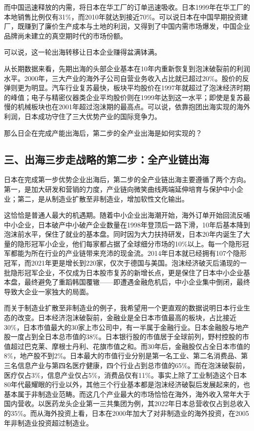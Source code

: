 而中国迅速释放的内需，将日本在华工厂的订单迅速吸收。日本1999年在华工厂的本地销售比例仅有31\%，而2010年就达到接近70\%。可以说日本在中国早期投资建厂，既赚到了廉价生产成本与土地的利润，又得到了中国内需市场爆发，中国企业品牌尚未建立的真空期时代的市场份额。

可以说，这一轮出海转移让日本企业赚得盆满钵满。

从长期数据来看，先期出海的头部企业基本在10年内重新恢复到泡沫破裂前的利润水平。2000年，三大产业的海外子公司自营业务收入占比就已超过20\%。股价的反弹则更为明显。汽车行业复苏最快，板块平均股价在1997年就超过了泡沫经济时期的峰值；电子与精密仪器类企业平均股价则在1999年达到这一水平；即使是复苏最慢的机械板块也在2001年超过泡沫期的最高点。可以说，依靠抱团出海实现的海外利润，日本成功守住了三大优势产业的国际竞争力。

那么日企在完成产能出海后，第二步的全产业出海是如何实现的？

\subsection{三、出海三步走战略的第二步：全产业链出海}

日本在完成第一步优势企业出海后，第二步的全产业链出海主要遵循了两个方向。第一，是加大研发和营销的力度，产业链向微笑曲线两端延伸培育与保护中小企业；第二，是从制造业扩散至非制造业，增加软性文化输出。

这恰恰是普通人最大的机遇期。随着中小企业出海潮开始，海外订单开始回流反哺中小企业，日本破产中小破产企业数量在1998年登顶后一路下滑，10年后基本降到泡沫前水平，保住了就业的基本盘。同时因为大力扶持研发，日本20年内诞生了大量的隐形冠军小企业，他们每家都占据了全球细分市场的10\%以上。每一个隐形冠军都能为所在行业的产业链带来充沛的现金流。2014年日本就已经拥有107个隐形冠军，而2021年更是增长到220家，仅次于德国与美国。泡沫经济破灭后涌现的一批隐形冠军企业，不仅成为日本股市复苏的新增长点，更是保住了日本中小企业基本盘，最终避免了重蹈韩国覆辙——即遭遇金融危机后，中小企业集中倒闭，最终导致大企业一家独大的局面。

而关于制造业扩散至非制造业的例子，我希望用一个更直观的数据说明日本行业生态的改变。日本经济泡沫破裂前，金融业是全日本市值最高的板块，占比接近30\%，日本市值最大的30家上市公司中，有一半属于金融行业。日本金融股与地产股一度占到全日本总市值的38\%。日本银行股的市值居于全球前列，野村控股的市值超过巴克莱、摩根士丹利、花旗市值之和。而30年后，金融股仅占全日本市值的8\%，地产股不到2\%。日本最大的市值行业分别是第一名工业、第二名消费品、第三名信息产业与第四名医疗健康，四个行业占到总市值的65\%。而在泡沫破裂前，医疗仅占3\%，信息产业仅占5\%，消费品仅有11\%。事实上除了工业制造这个日本80年代最耀眼的行业以外，其他三个行业基本都是泡沫经济破裂后发展起来的，也基本属于非制造业范畴。而这几个产业最大的市场恰恰在海外，海外收入常年大于国内营收。以医药龙头企业第一三共集团为例，其2022年日本总营收仅占到总收入的35\%。而从海外投资上看，日本在2000年加大了对非制造业的海外投资，在2005年非制造业投资超过制造业。

